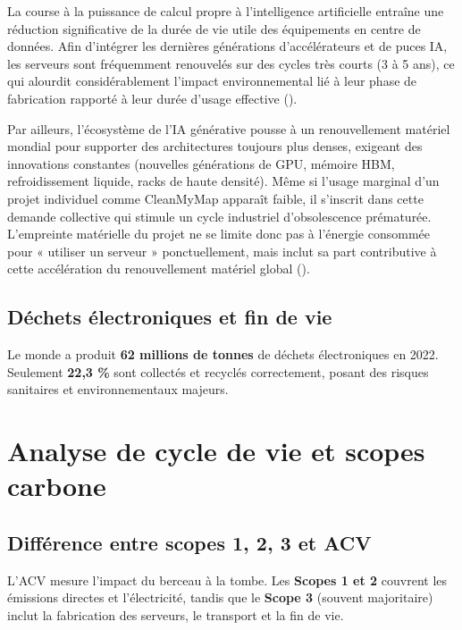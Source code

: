 \documentclass[
  10pt,
  a4paper,
  DIV=11,
  numbers=noendperiod,
  oneside]{scrreprt}
\let\oldtextbf\textbf
\renewcommand{\textbf}[1]{\oldtextbf{\textcolor{cmmnavy}{#1}}}
\begin{document}
La course à la puissance de calcul propre à l'intelligence artificielle
entraîne une réduction significative de la durée de vie utile des
équipements en centre de données. Afin d'intégrer les dernières
générations d'accélérateurs et de puces IA, les serveurs sont
fréquemment renouvelés sur des cycles très courts (3 à 5 ans), ce qui
alourdit considérablement l'impact environnemental lié à leur phase de
fabrication rapporté à leur durée d'usage effective
().

Par ailleurs, l'écosystème de l'IA générative pousse à un renouvellement
matériel mondial pour supporter des architectures toujours plus denses,
exigeant des innovations constantes (nouvelles générations de GPU,
mémoire HBM, refroidissement liquide, racks de haute densité). Même si
l'usage marginal d'un projet individuel comme CleanMyMap apparaît
faible, il s'inscrit dans cette demande collective qui stimule un cycle
industriel d'obsolescence prématurée. L'empreinte matérielle du projet
ne se limite donc pas à l'énergie consommée pour « utiliser un serveur »
ponctuellement, mais inclut sa part contributive à cette accélération du
renouvellement matériel global
().

\subsection{Déchets électroniques et fin de
vie}\label{duxe9chets-uxe9lectroniques-et-fin-de-vie}

Le monde a produit \textbf{62 millions de tonnes} de déchets
électroniques en 2022. Seulement \textbf{22,3 \%} sont collectés et
recyclés correctement, posant des risques sanitaires et environnementaux
majeurs.

\section{Analyse de cycle de vie et scopes
carbone}\label{analyse-de-cycle-de-vie-et-scopes-carbone}

\subsection{Différence entre scopes 1, 2, 3 et
ACV}\label{diffuxe9rence-entre-scopes-1-2-3-et-acv}

L'ACV mesure l'impact du berceau à la tombe. Les \textbf{Scopes 1 et 2}
couvrent les émissions directes et l'électricité, tandis que le
\textbf{Scope 3} (souvent majoritaire) inclut la fabrication des
serveurs, le transport et la fin de vie.
\end{document}
